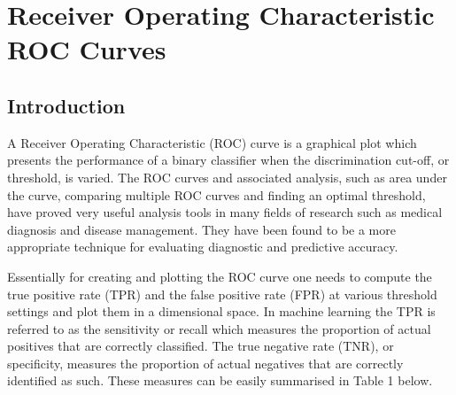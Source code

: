 \chapter{Receiver Operating Characteristic ROC Curves}
\label{ch:roc-curves}

\section{Introduction}
A Receiver Operating Characteristic (ROC) curve is a graphical plot which presents the performance of a binary classifier when the discrimination cut-off, or threshold, is varied. The ROC curves and associated analysis, such as area under the curve, comparing multiple ROC curves and finding an optimal threshold, have proved very useful analysis tools in many fields of research such as medical diagnosis and disease management. They have been found to be a more appropriate technique for evaluating diagnostic and predictive accuracy.

Essentially for creating and plotting the ROC curve one needs to compute the true positive rate (TPR) and the false positive rate (FPR) at various threshold settings and plot them in a dimensional space. In machine learning the TPR is referred to as the sensitivity or recall which measures the proportion of actual positives that are correctly classified. The true negative rate (TNR), or specificity, measures the proportion of actual negatives that are correctly identified as such. These measures can be easily summarised in Table 1 below.

